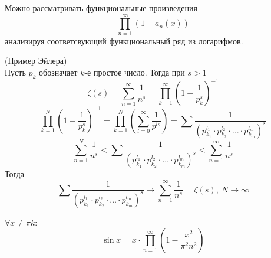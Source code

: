 \begin{comm}
    Можно рассматривать функциональные произведения
    \[\prod\limits_{n=1}^{\infty}(1+a_n(x))\]
    анализируя соответсвующий функциональный ряд из логарифмов.
\end{comm}
\begin{example} (Пример Эйлера)\\
    Пусть $p_k$ обозначает $k$-е простое число. Тогда при $s>1$ 
    \[\zeta(s)=\sum\limits_{n=1}^{\infty}\frac{1}{n^s}=\prod\limits_{k=1}^{\infty}(1-\frac{1}{p_k^s})^{-1}\]
    \[\prod\limits_{k=1}^{N}\left(1-\frac{1}{p_k^s}\right)^{-1}=\prod\limits_{k=1}^{N}\left(\sum\limits_{l=0}^{\infty}\frac{1}{p^{ls}}\right)=\sum\frac{1}{(p_{k_1}^{l_1}\cdot p_{k_2}^{l_2}\cdot \dots\cdot p_{k_m}^{l_m})^s}\]
    \[\sum\limits_{n=1}^{N}\frac{1}{n^s}<\sum\frac{1}{(p_{k_1}^{l_1}\cdot p_{k_2}^{l_2}\cdot \dots\cdot p_{k_m}^{l_m})^s}<\sum\limits_{n=1}^{\infty}\frac{1}{n^s}\]
    Тогда
    \[\sum\frac{1}{(p_{k_1}^{l_1}\cdot p_{k_2}^{l_2}\cdot \dots\cdot p_{k_m}^{l_m})^s} \to \sum\limits_{n=1}^{\infty}\frac{1}{n^s}=\zeta(s),\ N\to \infty\]
\end{example}
\begin{theorem}
    $\forall x\ne \pi k$:
    \[\sin{x}=x\cdot \prod\limits_{n=1}^{\infty}\left(1-\frac{x^2}{\pi^2 n^2}\right)\]
\end{theorem}
